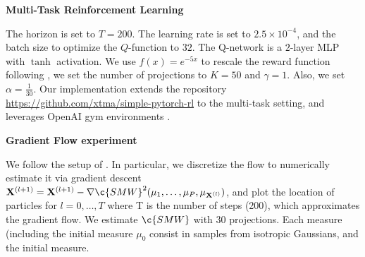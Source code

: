 \documentclass{article}
\begin{document}
 \textbf{Multi-Task Reinforcement Learning} 
 
 The horizon is set to $T=200$. The learning rate is set to $2.5\times 10^{-4}$, and the batch size to optimize the $Q$-function to $32$. The Q-network is a $2$-layer MLP with $\tanh$ activation. We use $f(x) = e^{-5x}$ to rescale the reward function following \textcite{Dadashi2020PrimalWI}, we set the number of projections to $K=50$ and $\gamma=1$. Also, we set $\alpha = \frac{1}{30}$. Our implementation extends the repository \url{https://github.com/xtma/simple-pytorch-rl} to the multi-task setting, and leverages OpenAI gym environments \cite{gym}.
 
 \textbf{Gradient Flow experiment}
 
 We follow the setup of \textcite{bonneel}. In particular, we discretize the flow to numerically estimate it via gradient descent $\m{X}^{(l+1)} = \m{X}^{(l+1)} - \nabla \c{SMW}^2(\mu_1,\ldots,\mu_P, \mu_{ \m{X}^{(l)}})$, and plot the location of particles for $l=0,\ldots,T$ where T is the number of steps (200), which approximates the gradient flow. We estimate $\c{SMW}$ with $30$ projections. Each measure (including the initial measure $\mu_0$ consist in samples from isotropic Gaussians, and the initial measure. 
\end{document}
